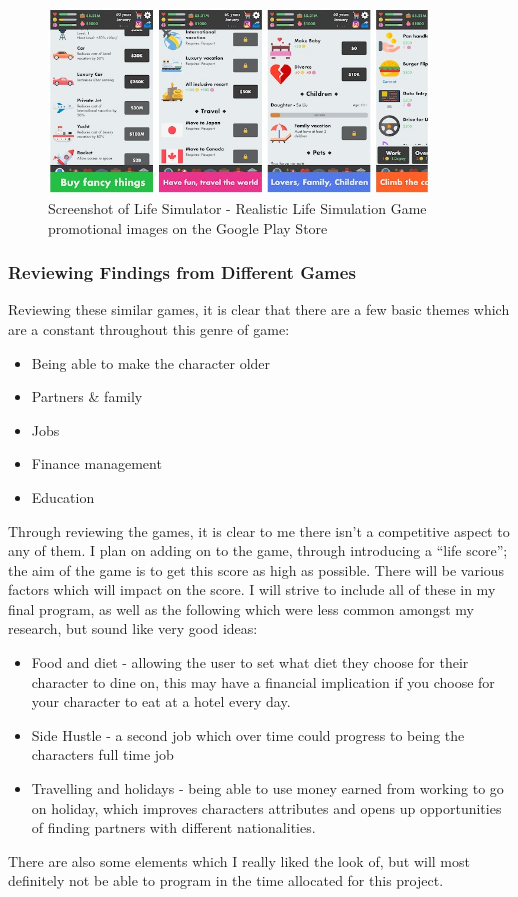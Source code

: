 \begin{figure}[H]
    \centering
    \includegraphics[width=0.9\textwidth]{images/analysis/rlsg.jpg}
    \caption{Screenshot of Life Simulator - Realistic Life Simulation Game promotional images on the Google Play Store}
    \label{fig:rlsg}
\end{figure}

\subsubsection{Reviewing Findings from Different Games}
Reviewing these similar games, it is clear that there are a few basic themes which are a constant throughout this genre of game:
\begin{itemize}
    \item Being able to make the character older
    \item Partners \& family
    \item Jobs
    \item Finance management
    \item Education
\end{itemize}
Through reviewing the games, it is clear to me there isn’t a competitive aspect to any of them. I plan on adding on to the game, through introducing a “life score”; the aim of the game is to get this score as high as possible. There will be various factors which will impact on the score.\newline
I will strive to include all of these in my final program, as well as the following which were less common amongst my research, but sound like very good ideas:
\begin{itemize}
    \item Food and diet - allowing the user to set what diet they choose for their character to dine on, this may have a financial implication if you choose for your character to eat at a hotel every day.
    \item Side Hustle - a second job which over time could progress to being the characters full time job
    \item Travelling and holidays - being able to use money earned from working to go on holiday, which improves characters attributes and opens up opportunities of finding partners with different nationalities.
\end{itemize}
There are also some elements which I really liked the look of, but will most definitely not be able to program in the time allocated for this project.

